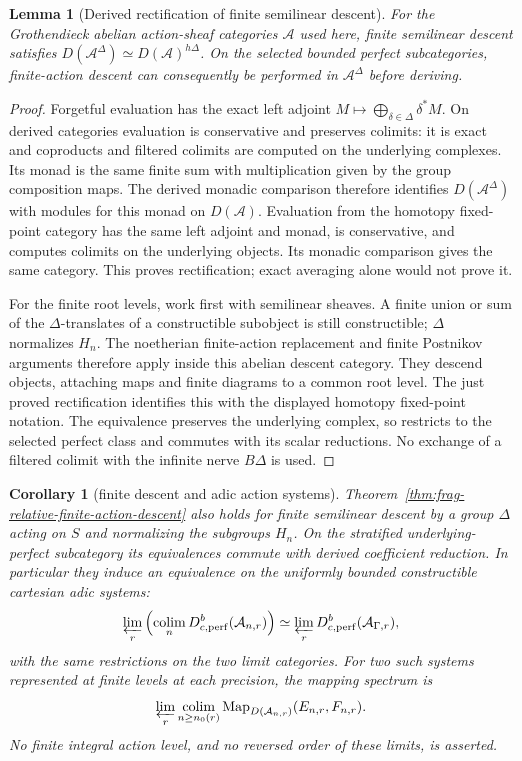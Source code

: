 \documentclass[11pt]{article}
\newtheorem{lemma}[theorem]{Lemma}
\newtheorem{corollary}[theorem]{Corollary}
\theoremstyle{definition}
\theoremstyle{remark}
\begin{document}
\begin{lemma}[Derived rectification of finite semilinear descent]
\label{lem:frag-finite-equivariant-rectification}
For the Grothendieck abelian action-sheaf categories $\mathcal A$ used
here, finite semilinear descent satisfies
$D(\mathcal A^\Delta)\simeq D(\mathcal A)^{h\Delta}$.
On the selected bounded perfect subcategories, finite-action descent
can consequently be performed in $\mathcal A^\Delta$ before deriving.
\end{lemma}
\begin{proof}
Forgetful evaluation has the exact left adjoint
$M\mapsto\bigoplus_{\delta\in\Delta}\delta^*M$.
On derived categories evaluation is conservative and preserves
colimits: it is exact and coproducts and filtered colimits are
computed on the underlying complexes.  Its monad is the same finite
sum with multiplication given by the group composition maps.
The derived monadic comparison therefore identifies
$D(\mathcal A^\Delta)$ with modules for this monad on $D(\mathcal A)$.
Evaluation from the homotopy fixed-point category has the same
left adjoint and monad, is conservative, and computes colimits on
the underlying objects.  Its monadic comparison gives the same
category.  This proves rectification; exact averaging alone would
not prove it.

For the finite root levels, work first with semilinear sheaves.
A finite union or sum of the $\Delta$-translates of a constructible
subobject is still constructible; $\Delta$ normalizes $H_n$.
The noetherian finite-action replacement and finite Postnikov
arguments therefore apply inside this abelian descent category.
They descend objects, attaching maps and finite diagrams to a
common root level.  The just proved rectification identifies this
with the displayed homotopy fixed-point notation.  The equivalence
preserves the underlying complex, so restricts to the selected
perfect class and commutes with its scalar reductions.  No exchange
of a filtered colimit with the infinite nerve $B\Delta$ is used.
\end{proof}

\begin{corollary}[finite descent and adic action systems]
\label{cor:frag-relative-adic-action-descent}
Theorem~\ref{thm:frag-relative-finite-action-descent} also holds for
finite semilinear descent by a group $\Delta$ acting on $S$ and
normalizing the subgroups $H_n$.  On the stratified underlying-perfect
subcategory its equivalences commute with derived coefficient
reduction.  In particular they induce an equivalence on the uniformly
bounded constructible cartesian adic systems:
\[
 \varprojlim_r\left(
   \operatorname*{colim}_n D_{c,\mathrm{perf}}^b(\mathcal A_{n,r})
                 \right)
 \simeq
 \varprojlim_r D_{c,\mathrm{perf}}^b(\mathcal A_{\Gamma,r}),
\]
with the same restrictions on the two limit categories.  For two such
systems represented at finite levels at each precision, the mapping
spectrum is
\[
 \varprojlim_r\operatorname*{colim}_{n\ge n_0(r)}
 \operatorname{Map}_{D(\mathcal A_{n,r})}(E_{n,r},F_{n,r}).
\]
No finite integral action level, and no reversed order of these limits,
is asserted.
\end{corollary}
\end{document}
